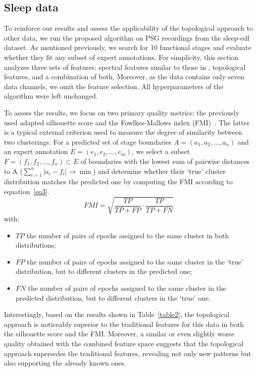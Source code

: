 \documentclass[pdflatex,sn-basic,Numbered]{sn-jnl}
\begin{document}
\subsection{Sleep data}

To reinforce our results and assess the applicability of the topological approach to other data, we run the proposed algorithm on PSG recordings from the sleep-edf~\cite{SleepEdf,PhysioNet} dataset. As mentioned previously, we search for 10 functional stages and evaluate whether they fit any subset of expert annotations. For simplicity, this section analyzes three sets of features: spectral features similar to those in \cite{SDA}, topological features, and a combination of both. Moreover, as the data contains only seven data channels, we omit the feature selection. All hyperparameters of the algorithm were left unchanged.

To assess the results, we focus on two primary quality metrics: the previously used adapted silhouette score and the Fowlkes-Mallows index (FMI)~\cite{Fowlkes01091983}. The latter is a typical external criterion used to measure the degree of similarity between two clusterings. For a predicted set of stage boundaries $A = (a_1, a_2, \dots, a_n)$ and an expert annotation $E = (e_1, e_2, \dots, e_m)$, we select a subset $F = (f_1, f_2, \dots, f_n) \subset E$ of boundaries with the lowest sum of pairwise distances to A ($\sum_{i = 1}^{n} |a_i - f_i| \rightarrow \min$) and determine whether their `true' cluster distribution matches the predicted one by computing the FMI according to equation~\eqref{eq3}.
\begin{equation}
    FMI = \sqrt{\frac{TP}{TP + FP} \cdot \frac{TP}{TP + FN}} \label{eq3}
\end{equation}
with:
\begin{itemize}
    \item
        $TP$ the number of pairs of epochs assigned to the same cluster in both distributions;
    \item
        $FP$ the number of pairs of epochs assigned to the same cluster in the `true' distribution, but to different clusters in the predicted one;
    \item
        $FN$ the number of pairs of epochs assigned to the same cluster in the predicted distribution, but to different clusters in the `true' one.
\end{itemize}

Interestingly, based on the results shown in Table~\ref{table2}, the topological approach is noticeably superior to the traditional features for this data in both the silhouette score and the FMI. Moreover, a similar or even slightly worse quality obtained with the combined feature space suggests that the topological approach supersedes the traditional features, revealing not only new patterns but also supporting the already known ones.
\end{document}
